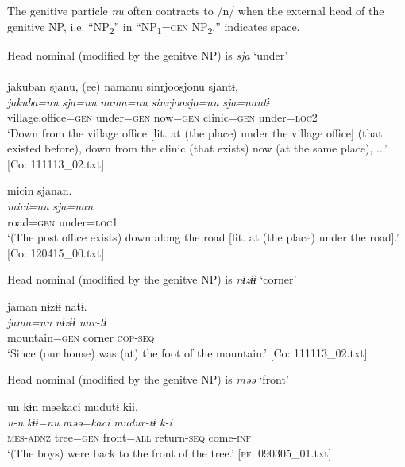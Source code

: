   The genitive particle \textit{nu} often contracts to /n/ when the external head of the genitive NP, i.e. “NP\textsubscript{2}” in “NP\textsubscript{1}=\textsc{gen} NP\textsubscript{2},” indicates space.

\ea\label{ex:6-81}
 Head nominal (modified by the genitve NP) is \textit{sja} ‘under’\\

 \ea{}\\
{\TM}
\glll  jakuban  sjanu,  (ee)  namanu  {\textbar}sinrjoosjo{\textbar}nu    sjantɨ,\\
\textit{jakuba=nu}  \textit{sja=nu}    \textit{nama=nu}  \textit{sinrjoosjo=nu}    \textit{sja=nantɨ}\\
village.office=\textsc{gen}  under=\textsc{gen}    now=\textsc{gen}  clinic=\textsc{gen}    under=\textsc{loc2}\\
\glt ‘Down from the village office [lit. at (the place) under the village office] (that existed before), down from the clinic (that exists) now (at the same place), ...’ [Co: 111113\_02.txt]
\z

\ex {\TM}  micin  sjanan.\\
\glll \textit{mici=nu}  \textit{sja=nan}\\
road=\textsc{gen}  under=\textsc{loc1}\\
\glt ‘(The post office exists) down along the road [lit. at (the place) under the road].’ [Co: 120415\_00.txt]
\z

  Head nominal (modified by the genitve NP) is \textit{nɨzɨɨ} ‘corner’

\ex {\TM}  jaman  nɨzɨɨ  natɨ.\\
\glll \textit{jama=nu}  \textit{nɨzɨɨ}  \textit{nar-tɨ}\\
mountain=\textsc{gen}  corner  \textsc{cop}-\textsc{seq}\\
\glt ‘Since (our house) was (at) the foot of the mountain.’ [Co: 111113\_02.txt]
\z

  Head nominal (modified by the genitve NP) is \textit{məə} ‘front’

\ex {\TM}  un  kɨn  məəkaci  mudutɨ  kii.\\
\glll \textit{u-n}  \textit{kɨɨ=nu}  \textit{məə=kaci}  \textit{mudur-tɨ}  \textit{k-i}\\
\textsc{mes}-\textsc{adnz}  tree=\textsc{gen}  front=\textsc{all}  return-\textsc{seq}  come-\textsc{inf}\\
\glt ‘(The boys) were back to the front of the tree.’ [\textsc{pf}: 090305\_01.txt]
\z


